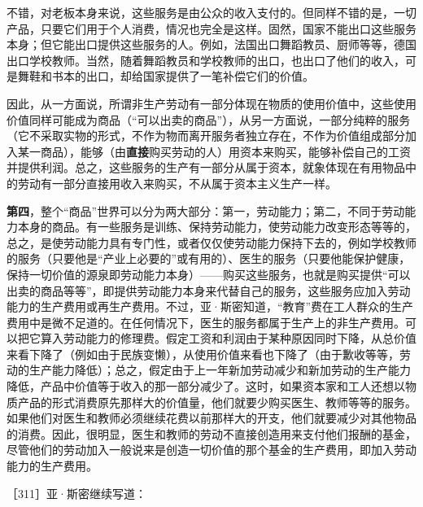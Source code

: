 不错，对老板本身来说，这些服务是由公众的收入支付的。但同样不错的是，一切产品，只要它们用于个人消费，情况也完全是这样。固然，国家不能出口这些服务本身；但它能出口提供这些服务的人。例如，法国出口舞蹈教员、厨师等等，德国出口学校教师。当然，随着舞蹈教员和学校教师的出口，也出口了他们的收入，可是舞鞋和书本的出口，却给国家提供了一笔补偿它们的价值。

因此，从一方面说，所谓非生产劳动有一部分体现在物质的使用价值中，这些使用价值同样可能成为商品（“可以出卖的商品”），从另一方面说，一部分纯粹的服务（它不采取实物的形式，不作为物而离开服务者独立存在，不作为价值组成部分加入某一商品），能够（由\textbf{直接}购买劳动的人）用资本来购买，能够补偿自己的工资并提供利润。总之，这些服务的生产有一部分从属于资本，就象体现在有用物品中的劳动有一部分直接用收入来购买，不从属于资本主义生产一样。

\textbf{第四}，整个“商品”世界可以分为两大部分：第一，劳动能力；第二，不同于劳动能力本身的商品。有一些服务是训练、保持劳动能力，使劳动能力改变形态等等的，总之，是使劳动能力具有专门性，或者仅仅使劳动能力保持下去的，例如学校教师的服务（只要他是“产业上必要的”或有用的）、医生的服务（只要他能保护健康，保持一切价值的源泉即劳动能力本身）——购买这些服务，也就是购买提供“可以出卖的商品等等”，即提供劳动能力本身来代替自己的服务，这些服务应加入劳动能力的生产费用或再生产费用。不过，亚·斯密知道，“教育”费在工人群众的生产费用中是微不足道的。在任何情况下，医生的服务都属于生产上的非生产费用。可以把它算入劳动能力的修理费。假定工资和利润由于某种原因同时下降，从总价值来看下降了（例如由于民族变懒），从使用价值来看也下降了（由于歉收等等，劳动的生产能力降低）；总之，假定由于上一年新加劳动减少和新加劳动的生产能力降低，产品中价值等于收入的那一部分减少了。这时，如果资本家和工人还想以物质产品的形式消费原先那样大的价值量，他们就要少购买医生、教师等等的服务。如果他们对医生和教师必须继续花费以前那样大的开支，他们就要减少对其他物品的消费。因此，很明显，医生和教师的劳动不直接创造用来支付他们报酬的基金，尽管他们的劳动加入一般说来是创造一切价值的那个基金的生产费用，即加入劳动能力的生产费用。

［311］亚·斯密继续写道：

